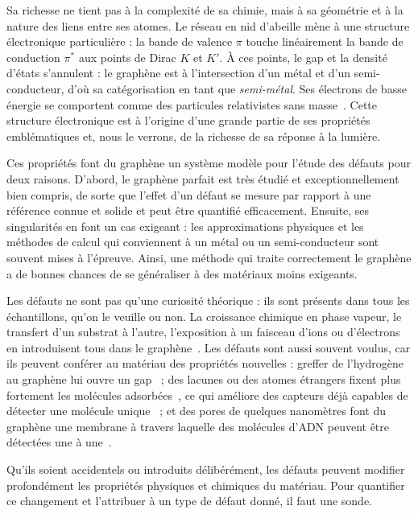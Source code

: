 Sa richesse ne tient pas à la complexité de sa chimie, mais à sa géométrie et à la nature des liens entre ses atomes. Le réseau en nid d'abeille mène à une structure électronique particulière : la bande de valence $\pi$ touche linéairement la bande de conduction $\pi^*$ aux points de Dirac $K$ et $K'$. À ces points, le gap et la densité d'états s'annulent : le graphène est à l'intersection d'un métal et d'un semi-conducteur, d'où sa catégorisation en tant que \textit{semi-métal}. Ses électrons de basse énergie se comportent comme des particules relativistes sans masse~\cite{castronetoElectronicPropertiesGraphene2009}. Cette structure électronique est à l'origine d'une grande partie de ses propriétés emblématiques et, nous le verrons, de la richesse de sa réponse à la lumière.

Ces propriétés font du graphène un système modèle pour l'étude des défauts pour deux raisons. D'abord, le graphène parfait est très étudié et exceptionnellement bien compris, de sorte que l'effet d'un défaut se mesure par rapport à une référence connue et solide et peut être quantifié efficacement. Ensuite, ses singularités en font un cas exigeant : les approximations physiques et les méthodes de calcul qui conviennent à un métal ou un semi-conducteur sont souvent mises à l'épreuve. Ainsi, une méthode qui traite correctement le graphène a de bonnes chances de se généraliser à des matériaux moins exigeants.

\bigskip
{}

Les défauts ne sont pas qu'une curiosité théorique : ils sont présents dans tous les échantillons, qu'on le veuille ou non. La croissance chimique en phase vapeur, le transfert d'un substrat à l'autre, l'exposition à un faisceau d'ions ou d'électrons en introduisent tous dans le graphène~\cite{banhartStructuralDefectsGraphene2011}. Les défauts sont aussi souvent voulus, car ils peuvent conférer au matériau des propriétés nouvelles : greffer de l'hydrogène au graphène lui ouvre un gap~\cite{eliasControlGraphenesProperties2009} ; des lacunes ou des atomes étrangers fixent plus fortement les molécules adsorbées~\cite{zhangImprovingGasSensing2009}, ce qui améliore des capteurs déjà capables de détecter une molécule unique~\cite{schedinDetectionIndividualGas2007} ; et des pores de quelques nanomètres font du graphène une membrane à travers laquelle des molécules d'ADN peuvent être détectées une à une~\cite{garajGrapheneSubnanometreTranselectrode2010}.

Qu'ils soient accidentels ou introduits délibérément, les défauts peuvent modifier profondément les propriétés physiques et chimiques du matériau. Pour quantifier ce changement et l'attribuer à un type de défaut donné, il faut une sonde.

